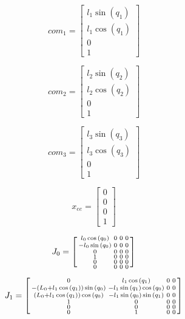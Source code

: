 \documentclass{article}
\begin{document}
\begin{equation}
	com_1 = \begin{bmatrix}
 	l_{1} \sin{(q_{1} )}\\
 	l_{1} \cos{(q_{1} )}\\
 	0\\
 	1
\end{bmatrix}
\end{equation}

\begin{equation}
	com_2 = \begin{bmatrix}
 	l_{2} \sin{(q_{2} )}\\
 	l_{2} \cos{(q_{2} )}\\
 	0\\
 	1
\end{bmatrix}
\end{equation}

\begin{equation}
	com_3 = \begin{bmatrix}
  	l_{3} \sin{(q_{3} )}\\
  	l_{3} \cos{(q_{3} )}\\
  	0\\
  	1
\end{bmatrix}
\end{equation}

\begin{equation}
	x_{ee} = \begin{bmatrix}
 	0\\
 	0\\
 	0\\
 	1
\end{bmatrix}
\end{equation}

\begin{equation}
	J_0 = \begin{bsmallmatrix}
	l_{0} \cos{(q_{0} )} & 0 & 0 & 0\\
	- l_{0} \sin{(q_{0} )} & 0 & 0 & 0\\
	0 & 0 & 0 & 0\\
	1 & 0 & 0 & 0\\
	0 & 0 & 0 & 0\\
	0 & 0 & 0 & 0
\end{bsmallmatrix}
\end{equation}

\begin{equation}
	J_1 = \begin{bsmallmatrix}
	0 & l_{1} \cos{(q_{1} )} & 0 & 0\\
	- (L_{0} + l_{1} \cos{(q_{1} )}) \sin{(q_{0} )} & - l_{1} \sin{(q_{1} )} \cos{(q_{0} )} & 0 & 0\\
	(L_{0} + l_{1} \cos{(q_{1} )}) \cos{(q_{0} )} & - l_{1} \sin{(q_{0} )} \sin{(q_{1} )} & 0 & 0\\
	1 & 0 & 0 & 0\\
	0 & 0 & 0 & 0\\
	0 & 1 & 0 & 0
\end{bsmallmatrix}
\end{equation}
\end{document}
